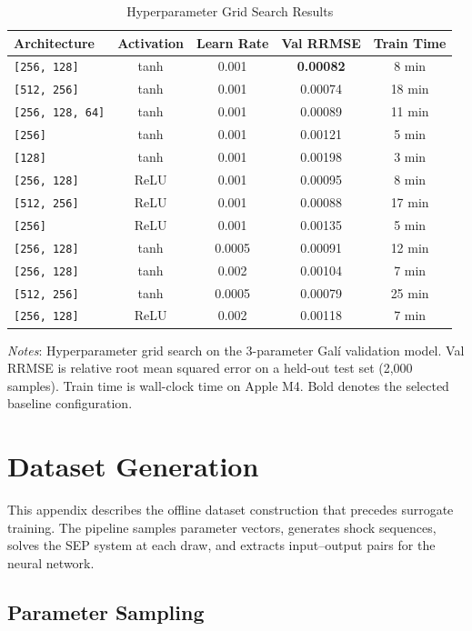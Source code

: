 \documentclass[12pt]{article}
\theoremstyle{plain}
\theoremstyle{definition}
\theoremstyle{remark}
\newcommand{\tablenotes}[1]{%
  \par\vspace{0.5em}%
  \noindent\begin{minipage}{\textwidth}%
  \raggedright\footnotesize #1%
  \end{minipage}\par%
}
\begin{document}
\begin{table}[htbp]
\centering
\caption{Hyperparameter Grid Search Results}
\label{tab:hyperparameter_grid}
\begin{tabular}{lcccc}
\toprule
Architecture & Activation & Learn Rate & Val RRMSE & Train Time \\
\midrule
\texttt{[256, 128]} & tanh & 0.001 & \textbf{0.00082} & 8 min \\
\texttt{[512, 256]} & tanh & 0.001 & 0.00074 & 18 min \\
\texttt{[256, 128, 64]} & tanh & 0.001 & 0.00089 & 11 min \\
\texttt{[256]} & tanh & 0.001 & 0.00121 & 5 min \\
\texttt{[128]} & tanh & 0.001 & 0.00198 & 3 min \\
\texttt{[256, 128]} & ReLU & 0.001 & 0.00095 & 8 min \\
\texttt{[512, 256]} & ReLU & 0.001 & 0.00088 & 17 min \\
\texttt{[256]} & ReLU & 0.001 & 0.00135 & 5 min \\
\texttt{[256, 128]} & tanh & 0.0005 & 0.00091 & 12 min \\
\texttt{[256, 128]} & tanh & 0.002 & 0.00104 & 7 min \\
\texttt{[512, 256]} & tanh & 0.0005 & 0.00079 & 25 min \\
\texttt{[256, 128]} & ReLU & 0.002 & 0.00118 & 7 min \\
\bottomrule
\end{tabular}
\smallskip
\tablenotes{\textit{Notes}: Hyperparameter grid search on the 3-parameter Gal\'{i} validation model. Val RRMSE is relative root mean squared error on a held-out test set (2,000 samples). Train time is wall-clock time on Apple M4. Bold denotes the selected baseline configuration.}
\end{table}


\section{Dataset Generation}
\label{app:dataset}

This appendix describes the offline dataset construction that precedes surrogate training. The pipeline samples parameter vectors, generates shock sequences, solves the SEP system at each draw, and extracts input--output pairs for the neural network.


\subsection{Parameter Sampling}
\end{document}
